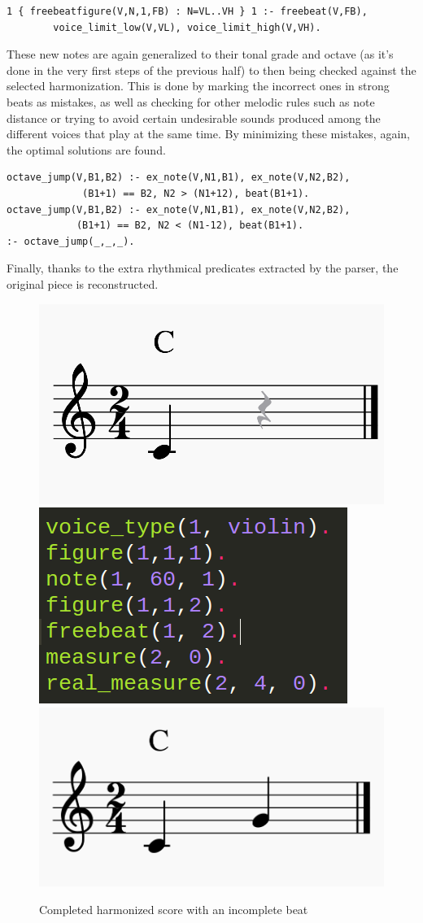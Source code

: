 \begin{Verbatim}[frame=single]
1 { freebeatfigure(V,N,1,FB) : N=VL..VH } 1 :- freebeat(V,FB),
		voice_limit_low(V,VL), voice_limit_high(V,VH).
\end{Verbatim}

These new notes are again generalized to their tonal grade and octave (as it's done in the very first steps of the previous half) to then being checked against the selected harmonization. This is done by marking the incorrect ones in strong beats as mistakes, as well as checking for other melodic rules such as note distance or trying to avoid certain undesirable sounds produced among the different voices that play at the same time. By minimizing these mistakes, again, the optimal solutions are found.
	\begin{Verbatim}[frame=single]
octave_jump(V,B1,B2) :- ex_note(V,N1,B1), ex_note(V,N2,B2),
          	 (B1+1) == B2, N2 > (N1+12), beat(B1+1).
octave_jump(V,B1,B2) :- ex_note(V,N1,B1), ex_note(V,N2,B2),
           	(B1+1) == B2, N2 < (N1-12), beat(B1+1).
:- octave_jump(_,_,_).
	\end{Verbatim}

Finally, thanks to the extra rhythmical predicates extracted by the parser, the original piece is reconstructed.

\begin{figure}[h]
	\centering
	\includegraphics[width=0.35\linewidth,valign=c]{imagenes/incomplete_score.png}
	\includegraphics[width=0.3\linewidth,valign=c]{imagenes/incomplete_facts.png}
	\includegraphics[width=0.35\linewidth]{imagenes/completed_score.png}
	\caption{Completed harmonized score with an incomplete beat}
	\label{fig:simple-piece-complete}
\end{figure}

